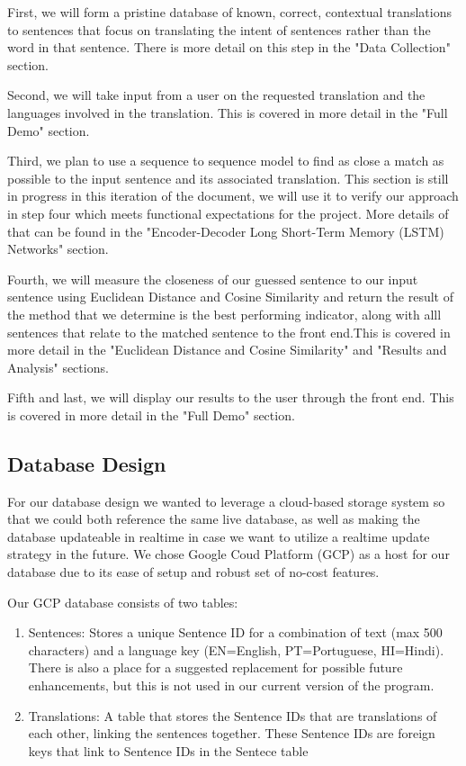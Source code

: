 \documentclass[runningheads]{llncs}
\begin{document}
	First, we will form a pristine database of known, correct, contextual translations to sentences that focus on translating the intent of sentences rather than the word in that sentence. There is more detail on this step in the "Data Collection" section. 

	Second, we will take input from a user on the requested translation and the languages involved in the translation. This is covered in more detail in the "Full Demo" section. 

	Third, we plan to use a sequence to sequence model to find as close a match as possible to the input sentence and its associated translation. This section is still in progress in this iteration of the document, we will use it to verify our approach in step four which meets functional expectations for the project. More details of that can be found in the "Encoder-Decoder Long Short-Term Memory (LSTM) Networks" section. 

	Fourth, we will measure the closeness of our guessed sentence to our input sentence using Euclidean Distance and  Cosine Similarity and return the result of the method that we determine is the best performing indicator, along with alll sentences that relate to the matched sentence to the front end.This is covered in more detail in the "Euclidean Distance and Cosine Similarity" and "Results and Analysis" sections.

	Fifth and last, we will display our results to the user through the front end. This is covered in more detail in the "Full Demo" section.
	
	\subsection{Database Design}
	For our database design we wanted to leverage a cloud-based storage system so that we could both reference the same live database, as well as making the database updateable in realtime in case we want to utilize a realtime update strategy in the future. We chose Google Coud Platform (GCP) as a host for our database due to its ease of setup and robust set of no-cost features. 
	
	Our GCP database consists of two tables:
			
		\begin{enumerate}
			\item Sentences: Stores a unique Sentence ID for a combination of text (max 500 characters) and a language key (EN=English, PT=Portuguese, HI=Hindi). There is also a place for a suggested replacement for possible future enhancements, but this is not used in our current version of the program.
			\item Translations: A table that stores the Sentence IDs that are translations of each other, linking the sentences together. These Sentence IDs are foreign keys that link to Sentence IDs in the Sentece table
		\end{enumerate}
\end{document}
